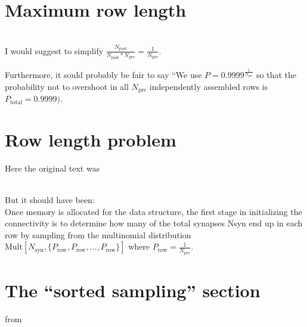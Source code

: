 \documentclass{article}
\begin{document}
\section{Maximum row length}
 \\[0.3cm]

I would suggest to simplify $\frac{N_{\text{post}}}{N_{\text{post}} *
    N_{\text{pre}}} = \frac{1}{N_{\text{pre}}}$.

  Furthermore, it sould probably be fair to say ``We use $P =
  0.9999^{\frac{1}{N_{\text{pre}}}
  }$
so that the probability not to
overshoot in all $N_{\text{pre}}$ independently assembled rows is
$P_{\text{total}} = 0.9999)$.
  
\section{Row length problem}
Here the original text was

\\[0.3cm]

But it should have been: \\
  Once memory is allocated for the data
structure, the first stage in initializing the connectivity is to
determine how many of the total synapses Nsyn end up in each
row by sampling from the multinomial distribution
$\text{Mult}[N_{\text{syn}}, \{P_{\text{row}},
    P_{\text{row}}, \ldots , P_{\text{row}} \}]$ where $P_{\text{row}}
  = \frac{1}{N_{\text{pre}}}$.

\section{The ``sorted sampling'' section}
from
\end{document}
